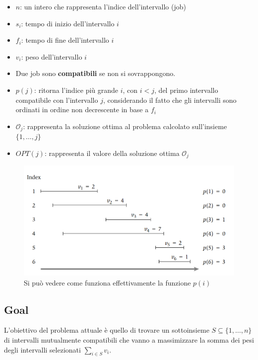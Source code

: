 \begin{itemize}
      \item
            $n$: un intero che rappresenta l'indice dell'intervallo (job)
      \item
            $s_i$: tempo di inizio dell'intervallo $i$
      \item
            $f_i$: tempo di fine dell'intervallo $i$
      \item
            $v_i$: peso dell'intervallo $i$
      \item
            Due job sono \textbf{compatibili} se non si sovrappongono.
      \item
            $p(j)$: ritorna l'indice più grande $i$, con $i < j$, del primo
            intervallo compatibile con l'intervallo $j$, considerando il fatto
            che gli intervalli sono ordinati in ordine non decrescente in base a
            $f_i$
      \item $\mathcal{O}_j$: rappresenta la soluzione ottima al problema
            calcolato sull'insieme $\{1, \ldots, j\}$
      \item
            $OPT(j)$: rappresenta il valore della soluzione ottima
            $\mathcal{O}_j$
\end{itemize}

\begin{figure}[H]
      \centering
      \includegraphics[width=14cm, keepaspectratio]{capitoli/programmazione_dinamica/imgs/wis_instance.png}
      \caption{Si può vedere come funziona effettivamente la funzione $p(i)$}
\end{figure}

\subsection{Goal}

L'obiettivo del problema attuale è quello di trovare un sottoinsieme
$S \subseteq \{1, \ldots, n\}$ di intervalli mutualmente compatibili
che vanno a massimizzare la somma dei pesi degli intervalli
selezionati $\sum_{i \in S} v_i$.

